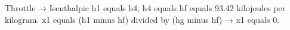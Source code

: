 Throttle → Isenthalpic  
h1 equals h4, h4 equals hf equals 93.42 kilojoules per kilogram.  
x1 equals (h1 minus hf) divided by (hg minus hf) → x1 equals 0.